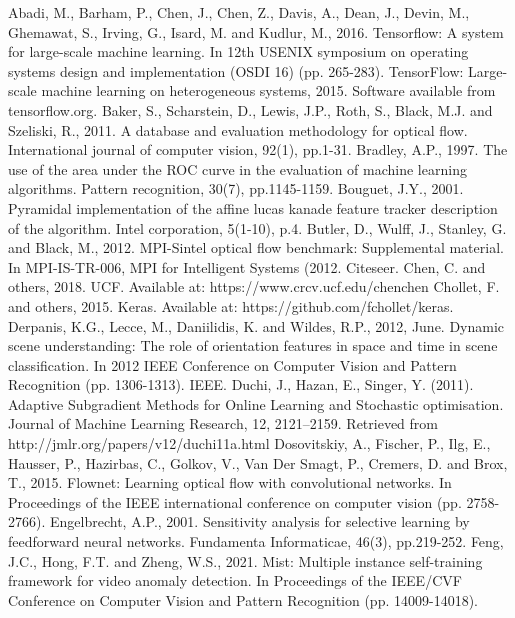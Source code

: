 \documentclass[sigplan,authorversion,nonacm, 9pt]{acmart}
\begin{document}
\begin{thebibliography}{00}
 Abadi, M., Barham, P., Chen, J., Chen, Z., Davis, A., Dean, J., Devin, M., Ghemawat, S., Irving, G., Isard, M. and Kudlur, M., 2016. Tensorflow: A system for large-scale machine learning. In 12th {USENIX} symposium on operating systems design and implementation ({OSDI} 16) (pp. 265-283).
TensorFlow: Large-scale machine learning on heterogeneous systems,
2015. Software available from tensorflow.org.
 Baker, S., Scharstein, D., Lewis, J.P., Roth, S., Black, M.J. and Szeliski, R., 2011. A database and evaluation methodology for optical flow. International journal of computer vision, 92(1), pp.1-31.
 Bradley, A.P., 1997. The use of the area under the ROC curve in the evaluation of machine learning algorithms. Pattern recognition, 30(7), pp.1145-1159.
 Bouguet, J.Y., 2001. Pyramidal implementation of the affine lucas kanade feature tracker description of the algorithm. Intel corporation, 5(1-10), p.4.
 Butler, D., Wulff, J., Stanley, G. and Black, M., 2012. MPI-Sintel optical flow benchmark: Supplemental material. In MPI-IS-TR-006, MPI for Intelligent Systems (2012. Citeseer.
 Chen, C. and others, 2018. UCF. Available at: https://www.crcv.ucf.edu/chenchen
 Chollet, F. and others, 2015. Keras. Available at: https://github.com/fchollet/keras.
 Derpanis, K.G., Lecce, M., Daniilidis, K. and Wildes, R.P., 2012, June. Dynamic scene understanding: The role of orientation features in space and time in scene classification. In 2012 IEEE Conference on Computer Vision and Pattern Recognition (pp. 1306-1313). IEEE.
 Duchi, J., Hazan, E., Singer, Y. (2011). Adaptive Subgradient Methods for Online Learning and Stochastic optimisation. Journal of Machine Learning Research, 12, 2121–2159. Retrieved from http://jmlr.org/papers/v12/duchi11a.html
 Dosovitskiy, A., Fischer, P., Ilg, E., Hausser, P., Hazirbas, C., Golkov, V., Van Der Smagt, P., Cremers, D. and Brox, T., 2015. Flownet: Learning optical flow with convolutional networks. In Proceedings of the IEEE international conference on computer vision (pp. 2758-2766). 
 Engelbrecht, A.P., 2001. Sensitivity analysis for selective learning by feedforward neural networks. Fundamenta Informaticae, 46(3), pp.219-252.
 Feng, J.C., Hong, F.T. and Zheng, W.S., 2021. Mist: Multiple instance self-training framework for video anomaly detection. In Proceedings of the IEEE/CVF Conference on Computer Vision and Pattern Recognition (pp. 14009-14018).

\end{thebibliography}
\end{document}
